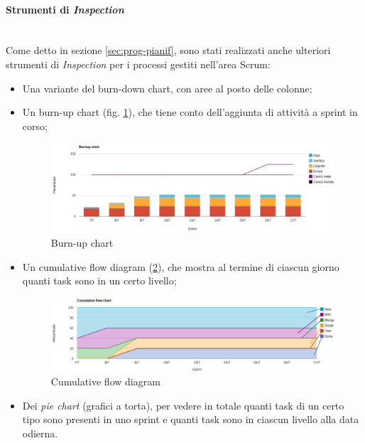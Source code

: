 \paragraph{Strumenti di \emph{Inspection}} \mbox{} \\

Come detto in sezione \ref{sec:prog-pianif}, sono stati realizzati anche
ulteriori strumenti di \emph{Inspection} per i processi gestiti nell'area
Scrum:

\begin{itemize}
\item Una variante del burn-down chart, con aree al posto delle colonne;
\item Un burn-up chart (fig. \ref{fig:burnup}), che tiene conto dell'aggiunta
  di attività a sprint in corso;

  \begin{figure}[H]%
  \centering
  \includegraphics[width=1.1\columnwidth]{immagini/burnup}
  \caption{Burn-up chart}
  \label{fig:burnup}%
  \end{figure}

\item Un cumulative flow diagram (\ref{fig:cumulative}), che mostra al termine
  di ciascun giorno quanti task sono in un certo livello;

  \begin{figure}[H]%
  \centering
  \includegraphics[width=1.1\columnwidth]{immagini/cumulativeFlow}
  \caption{Cumulative flow diagram}
  \label{fig:cumulative}%
  \end{figure}

\item Dei \emph{pie chart} (grafici a torta), per vedere in totale quanti task
  di un certo tipo sono presenti in uno sprint e quanti task sono in ciascun
  livello alla data odierna.
\end{itemize}

